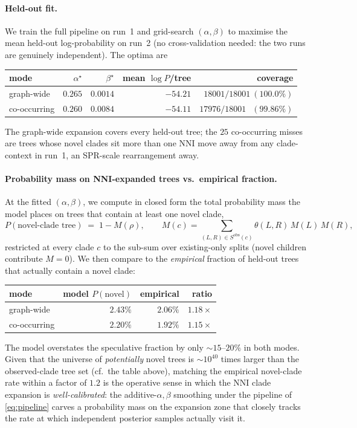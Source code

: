 \documentclass{article}
\begin{document}
\paragraph{Held-out fit.}
We train the full pipeline on run~1 and grid-search $(\alpha,\beta)$ to maximise
the mean held-out log-probability on run~2 (no cross-validation needed: the two
runs are genuinely independent). The optima are
\begin{center}
\renewcommand{\arraystretch}{1.1}
\begin{tabular}{lrrrr}
\hline
mode & $\alpha^\star$ & $\beta^\star$ & mean $\log P$/tree & coverage \\
\hline
graph-wide   & $0.265$ & $0.0014$ & $-54.21$ & $18001/18001\ (100.0\%)$ \\
co-occurring & $0.260$ & $0.0084$ & $-54.11$ & $17976/18001\ \phantom{0}(99.86\%)$ \\
\hline
\end{tabular}
\end{center}
The graph-wide expansion covers every held-out tree; the $25$ co-occurring
misses are trees whose novel clades sit more than one NNI move away from any
clade-context in run~1, an SPR-scale rearrangement away.

\paragraph{Probability mass on NNI-expanded trees vs.\ empirical fraction.}
At the fitted $(\alpha,\beta)$, we compute in closed form the total probability
mass the model places on trees that contain at least one novel clade,
\begin{equation}
  P(\text{novel-clade tree}) \;=\; 1 - M(\rho),
  \qquad
  M(c) = \sum_{(L,R)\in S^{\text{obs}}(c)} \theta(L,R)\,M(L)\,M(R),
\end{equation}
restricted at every clade $c$ to the sub-sum over existing-only splits (novel
children contribute $M=0$). We then compare to the \emph{empirical} fraction of
held-out trees that actually contain a novel clade:
\begin{center}
\renewcommand{\arraystretch}{1.1}
\begin{tabular}{lrrr}
\hline
mode & model $P(\text{novel})$ & empirical & ratio \\
\hline
graph-wide   & $2.43\%$ & $2.06\%$ & $1.18\times$ \\
co-occurring & $2.20\%$ & $1.92\%$ & $1.15\times$ \\
\hline
\end{tabular}
\end{center}
The model overstates the speculative fraction by only $\sim 15$--$20\%$ in both
modes. Given that the universe of \emph{potentially} novel trees is $\sim
10^{40}$ times larger than the observed-clade tree set (cf.\ the table above),
matching the empirical novel-clade rate within a factor of $1.2$ is the
operative sense in which the NNI clade expansion is \emph{well-calibrated}: the
additive-$\alpha,\beta$ smoothing under the pipeline of
\eqref{eq:pipeline} carves a probability mass on the expansion zone that closely
tracks the rate at which independent posterior samples actually visit it.
\end{document}
